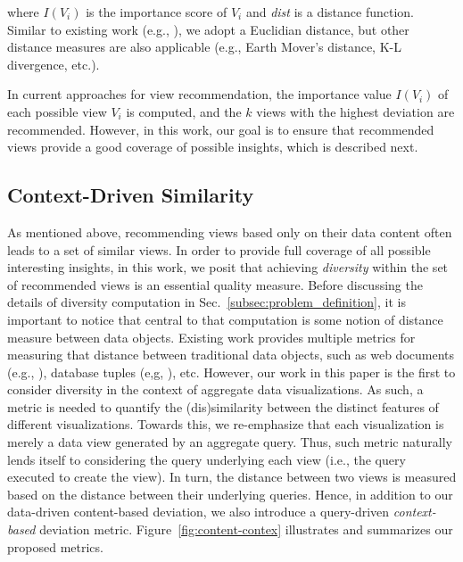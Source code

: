 \noindent where $ I\left(V_i\right) $ is the importance score of $ V_i$ and \textit{dist} is a distance function. 
%
Similar to existing work (e.g., \cite{Vartak2014,Vartak2015}), we adopt a Euclidian distance, but other distance measures are also applicable (e.g., Earth Mover's distance, K-L divergence, etc.). 

In current approaches for view recommendation, the importance value $I(V_i)$ of each possible view $V_i$ is computed, and the $k$ views with the highest deviation are recommended.
%
However, in this work, our goal is to ensure that recommended views provide a good coverage of possible insights, which is described next. 
\vspace{-2pt}
\subsection{Context-Driven Similarity}
\label{context-driven-deviation}

As mentioned above, recommending views based only on their data content often leads to a set of similar views. 
%
In order to provide full coverage of all possible interesting insights, in this work, we posit that achieving {\em diversity} within the set of recommended views is an essential quality measure. 
%
%
%	
Before discussing the details of diversity computation in Sec.~\ref{subsec:problem_definition}, it is important to notice that central to that computation is some notion of distance measure between data objects.
%
Existing work provides multiple metrics for measuring that distance between traditional data objects, such as web documents (e.g., \cite{Rafiei2010,Clarke2008,Zhang2008}), database tuples (e,g, \cite{DBLP:conf/sigmod/TranC10}), etc.
%
However, our work in this paper is the first to consider diversity in the context of aggregate data visualizations. 
%
As such, a metric is needed to quantify the (dis)similarity between the distinct features of different visualizations.
%
Towards this, we re-emphasize that each visualization is merely a data view generated by an aggregate query. 
%
Thus, such metric naturally lends itself to considering the query underlying each view (i.e., the query  executed to create the view). 
%
In turn, the distance between two views is measured based on the distance between their underlying queries.  
%
Hence, in addition to our data-driven content-based deviation, we also introduce a query-driven {\em context-based} deviation metric.
%
 Figure~\ref{fig:content-contex} illustrates and summarizes our proposed metrics.
	


